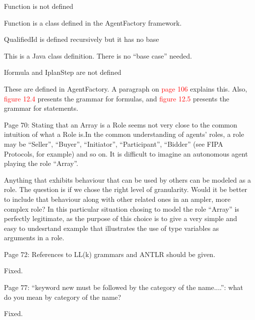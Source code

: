 \documentclass{article}
\newcommand*\R[1]{\textcolor{red}{#1}} %
\newenvironment{them}{\noindent\begingroup\color{blue}}{\endgroup\par}
\begin{document}
\begin{them}

Function is not defined 

\end{them}
Function is a class defined in the AgentFactory framework.

\begin{them}

QualifiedId is defined recursively but it has no base

\end{them}
This is a Java class definition. There is no ``base case'' needed.

\begin{them}

Iformula and IplanStep are not defined

\end{them}
These are defined in AgentFactory. A paragraph on \R{page 106}  explains this.
Also, \R{figure 12.4} presents the grammar for formulas, and \R{figure 12.5}
presents the grammar for statements.

\begin{them}

Page 70:
Stating that an Array is a Role seems not very close to the common intuition of
what a Role is.In the common understanding of agents' roles, a role may be
``Seller'', ``Buyer'', ``Initiator'', ``Participant'', ``Bidder'' (see FIPA Protocols,
for example) and so on. It is difficult to imagine an autonomous agent playing
the role ``Array''.

\end{them}
Anything that exhibits behaviour that can be used by others can be modeled as a
role. The question is if we chose the right level of granularity. Would it be
better to include that behaviour along with other related ones in an ampler,
more complex role? In this particular situation chosing to model the role
``Array'' is perfectly legitimate, as the purpose of this choice is to give a
very simple and easy to undesrtand example that illustrates the use of type
variables as arguments in a role.

\begin{them}

Page 72:
References to LL(k) grammars and ANTLR should be given.
\end{them}

Fixed.

\begin{them}

Page 77:
``keyword new must be followed by the category of the name....'': what do you
mean by category of the name?

\end{them}
Fixed.
\end{document}
